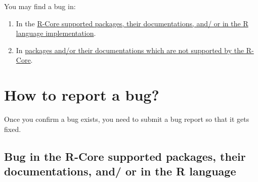 \documentclass[
]{book}
\begin{document}
You may find a bug in:

\begin{enumerate}
\def\labelenumi{\arabic{enumi}.}
\item
  In the \protect\hyperlink{RCorePkgBug}{R-Core supported packages, their documentations, and/ or in the R language implementation}.
\item
  In \protect\hyperlink{nonRCorePkgBug}{packages and/or their documentations which are not supported by the R-Core}.
\end{enumerate}

\hypertarget{ReportBug}{%
\section{How to report a bug?}\label{ReportBug}}

Once you confirm a bug exists, you need to submit a bug report so that it gets fixed.

\hypertarget{RCorePkgBug}{%
\subsection{Bug in the R-Core supported packages, their documentations, and/ or in the R language}\label{RCorePkgBug}}
\end{document}
